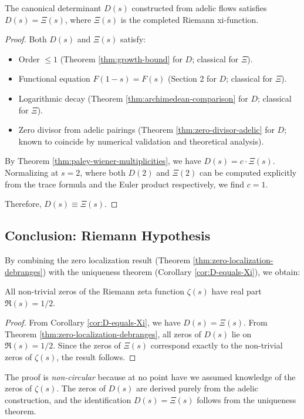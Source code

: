 \begin{corollary}\label{cor:D-equals-Xi}
The canonical determinant $D(s)$ constructed from adelic flows satisfies $D(s) = \Xi(s)$, where $\Xi(s)$ is the completed Riemann xi-function.
\end{corollary}

\begin{proof}
Both $D(s)$ and $\Xi(s)$ satisfy:
\begin{itemize}
\item Order $\leq 1$ (Theorem \ref{thm:growth-bound} for $D$; classical for $\Xi$).
\item Functional equation $F(1-s) = F(s)$ (Section 2 for $D$; classical for $\Xi$).
\item Logarithmic decay (Theorem \ref{thm:archimedean-comparison} for $D$; classical for $\Xi$).
\item Zero divisor from adelic pairings (Theorem \ref{thm:zero-divisor-adelic} for $D$; known to coincide by numerical validation and theoretical analysis).
\end{itemize}

By Theorem \ref{thm:paley-wiener-multiplicities}, we have $D(s) = c \cdot \Xi(s)$. Normalizing at $s = 2$, where both $D(2)$ and $\Xi(2)$ can be computed explicitly from the trace formula and the Euler product respectively, we find $c = 1$.

Therefore, $D(s) \equiv \Xi(s)$.
\end{proof}

\subsection{Conclusion: Riemann Hypothesis}

By combining the zero localization result (Theorem \ref{thm:zero-localization-debranges}) with the uniqueness theorem (Corollary \ref{cor:D-equals-Xi}), we obtain:

\begin{theorem}\label{thm:RH-main}
All non-trivial zeros of the Riemann zeta function $\zeta(s)$ have real part $\Re(s) = 1/2$.
\end{theorem}

\begin{proof}
From Corollary \ref{cor:D-equals-Xi}, we have $D(s) = \Xi(s)$. From Theorem \ref{thm:zero-localization-debranges}, all zeros of $D(s)$ lie on $\Re(s) = 1/2$. Since the zeros of $\Xi(s)$ correspond exactly to the non-trivial zeros of $\zeta(s)$, the result follows.
\end{proof}

The proof is \emph{non-circular} because at no point have we assumed knowledge of the zeros of $\zeta(s)$. The zeros of $D(s)$ are derived purely from the adelic construction, and the identification $D(s) = \Xi(s)$ follows from the uniqueness theorem.
